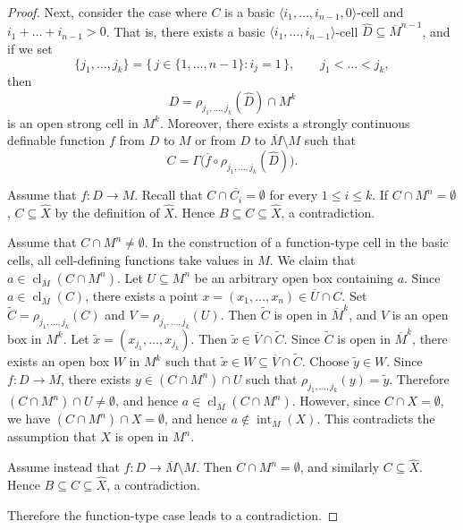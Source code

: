 \documentclass[10pt,a4paper]{amsart}
\DeclareMathOperator{\Int}{int}
\DeclareMathOperator{\cl}{cl}
\begin{document}
\begin{proof}
	Next, consider the case where $C$ is a basic $\langle i_1,\dots,i_{n-1},0 \rangle$-cell and $i_1+\dots+i_{n-1} > 0$.
	That is, there exists a basic $\langle i_1,\dots,i_{n-1} \rangle$-cell $\hat{D} \subseteq \overline{M}^{n-1}$, and if we set
	\[
	\{j_1,\ldots,j_k\} = \{\, j \in \{1,\dots,n-1\} : i_j = 1 \,\},
	\qquad j_1 < \dots < j_k,
	\]
	then
	\[
	D = \rho_{j_1,\ldots,j_k}(\hat{D}) \cap M^k
	\]
	is an open strong cell in $M^k$.
	Moreover, there exists a strongly continuous definable function $f$ from $D$ to $M$ or from $D$ to $\overline{M}\setminus M$ such that
	\[
	C = \Gamma\bigl(\overline{f} \circ \rho_{j_1,\ldots,j_k}(\hat{D})\bigr).
	\]
	
	Assume that $f:D\to M$.
	Recall that $C \cap \overline{C_i} = \emptyset$ for every $1 \leq i \leq k$.
	If $C \cap M^n = \emptyset$, $C \subseteq \hat{X}$ by the definition of $\hat{X}$.
	Hence $B \subseteq C \subseteq \hat{X}$, a contradiction.
	
	Assume that $C \cap M^n \ne \emptyset$.
	In the construction of a function-type cell in the basic cells, all cell-defining functions take values in $M$.
	We claim that $a \in \cl_{\overline{M}}(C \cap M^n)$.
	Let $U \subseteq M^n$ be an arbitrary open box containing $a$.
	Since $a \in \cl_{\overline{M}}(C)$, there exists a point $x=(x_1,\dots,x_n) \in \overline{U} \cap C$.
	Set $\tilde{C} = \rho_{j_1,\ldots,j_k}(C)$ and $V = \rho_{j_1,\ldots,j_k}(U)$.
	Then $\tilde{C}$ is open in $\overline{M}^k$, and $V$ is an open box in $M^k$.
	Let $\tilde{x} = (x_{j_1},\dots,x_{j_k})$.
	Then $\tilde{x} \in \overline{V} \cap \tilde{C}$.
	Since $\tilde{C}$ is open in $\overline{M}^k$, there exists an open box $W$ in $M^k$ such that
	$\tilde{x} \in \overline{W} \subseteq \overline{V} \cap \tilde{C}$.
	Choose $\tilde{y} \in W$.
	Since $f:D\to M$, there exists $y \in (C \cap M^n) \cap U$ such that $\rho_{j_1,\ldots,j_k}(y) = \tilde{y}$.
	Therefore $(C \cap M^n) \cap U \ne \emptyset$, and hence $a \in \cl_{\overline{M}}(C \cap M^n)$.
	However, since $C \cap X = \emptyset$, we have $(C \cap M^n) \cap X = \emptyset$, and hence $a \notin \Int_M(X)$.
	This contradicts the assumption that $X$ is open in $M^n$.
	
	Assume instead that $f:D\to \overline{M}\setminus M$.
	Then $C \cap M^n = \emptyset$, and similarly $C \subseteq \hat{X}$.
	Hence $B \subseteq C \subseteq \hat{X}$, a contradiction.
	
	Therefore the function-type case leads to a contradiction.
	

\end{proof}
\end{document}
